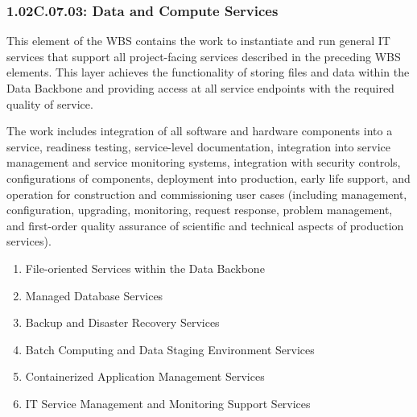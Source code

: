 \subsubsection*{1.02C.07.03: Data and Compute Services}

This element of the WBS contains the work to instantiate and run general IT services that support all project-facing services described in the preceding WBS elements.
This layer achieves the functionality of storing files and data within the Data Backbone and providing access at all service endpoints with the required quality of service.

The work includes integration of all software and hardware components into a service, readiness testing, service-level documentation, integration into service management and service monitoring systems, integration with security controls, configurations of components, deployment into production, early life support, and operation for construction and commissioning user cases (including management, configuration, upgrading, monitoring, request response, problem management, and first-order quality assurance of scientific and technical aspects of production services).

\begin{enumerate}

  \item{File-oriented Services within the Data Backbone}
  \item{Managed Database Services}
  \item{Backup and Disaster Recovery Services}
  \item{Batch Computing and Data Staging Environment Services}
  \item{Containerized Application Management Services}
  \item{IT Service Management and Monitoring Support Services}

\end{enumerate}

